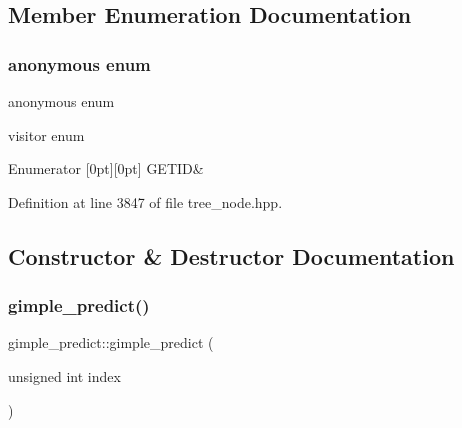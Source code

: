 \subsection{Member Enumeration Documentation}
\mbox{\label{structgimple__predict_aa912ea3fe76fe7e6bd57f9e2128c77ef}} 
\subsubsection{\texorpdfstring{anonymous enum}{anonymous enum}}
{\footnotesize\ttfamily anonymous enum}



visitor enum 

\begin{DoxyEnumFields}{Enumerator}
[0pt][0pt]{}\mbox{\label{structgimple__predict_aa912ea3fe76fe7e6bd57f9e2128c77efa16b1251d8d9c50d14c99e8e7c89cb55b}} 
G\+E\+T\+ID&\\
\hline

\end{DoxyEnumFields}


Definition at line 3847 of file tree\+\_\+node.\+hpp.



\subsection{Constructor \& Destructor Documentation}
\mbox{\label{structgimple__predict_ad7947ac858145d0aa8c8571dd8011a86}} 
\subsubsection{\texorpdfstring{gimple\+\_\+predict()}{gimple\_predict()}}
{\footnotesize\ttfamily gimple\+\_\+predict\+::gimple\+\_\+predict (\begin{DoxyParamCaption}\item[{unsigned int}]{index }\end{DoxyParamCaption})\hspace{0.3cm}{\ttfamily [explicit]}}



